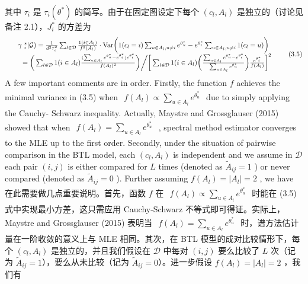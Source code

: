 其中 $\tau_{i}$ 是 $\tau_{i}(\theta^{*})$ 的简写。由于在固定图设定下每个 $(c_{l},A_{l})$ 是独立的（讨论见备注 2.1），$J_{i}^{*}$ 的方差为
\[
\begin{array}{r l} & {\mathrm{~\gamma~}_{i}^{*}|\mathcal{G}) = \frac{1}{d^{2}\tau_{i}^{2}}\sum_{l\in \mathcal{D}}\frac{1(i\in A_{l})}{f^{2}(A_{l})}\cdot \mathrm{Var}\bigg(1(c_{l} = i)\sum_{u\in A_{l},u\neq i}e^{\theta_{u}^{*}} - e^{\theta_{i}^{*}}\sum_{u\in A_{l},u\neq i}1(c_{l} = u)\bigg)}\\ & {\quad = \bigg(\sum_{l\in \mathcal{D}}1(i\in A_{l})\frac{(\sum_{u\in A_{l}}e^{\theta_{u}^{*}} - e^{\theta_{i}^{*}})e^{\theta_{i}^{*}}}{f(A_{l})^{2}}\bigg)\bigg / \bigg[\sum_{l\in \mathcal{D}}1(i\in A_{l})\bigg(\frac{\sum_{u\in A_{l}}e^{\theta_{u}^{*}} - e^{\theta_{i}^{*}}}{\sum_{u\in A_{l}}e^{\theta_{u}^{*}}}\bigg)\frac{e^{\theta_{i}^{*}}}{f(A_{l})}\bigg]^{2}} \end{array} \tag{3.5}
\]
A few important comments are in order. Firstly, the function $f$ achieves the minimal variance in (3.5) when $\begin{array}{r}{f(A_{l})\propto \sum_{u\in A_{l}}e^{\theta_{u}^{*}}} \end{array}$ due to simply applying the Cauchy- Schwarz inequality. Actually, Maystre and Grossglauser (2015) showed that when $\begin{array}{r}f(A_l) = \sum_{u\in A_l}e^{\theta_u^*} \end{array}$ , spectral method estimator converges to the MLE up to the first order. Secondly, under the situation of pairwise comparison in the BTL model, each $(c_l,A_l)$ is independent and we assume in $\mathcal{D}$ each pair $(i,j)$ is either compared for $L$ times (denoted as $\widetilde{A}_{ij} = 1$ ) or never compared (denoted as $\widetilde{A}_{ij} = 0$ ). Further assuming $f(A_{l}) = |A_{l}| = 2$ , we have
在此需要做几点重要说明。首先，函数 $f$ 在 $\begin{array}{r}{f(A_{l})\propto \sum_{u\in A_{l}}e^{\theta_{u}^{*}}} \end{array}$ 时能在 (3.5) 式中实现最小方差，这只需应用 Cauchy-Schwarz 不等式即可得证。实际上，Maystre and Grossglauser (2015) 表明当 $\begin{array}{r}f(A_l) = \sum_{u\in A_l}e^{\theta_u^*} \end{array}$ 时，谱方法估计量在一阶收敛的意义上与 MLE 相同。其次，在 BTL 模型的成对比较情形下，每个 $(c_l,A_l)$ 是独立的，并且我们假设在 $\mathcal{D}$ 中每对 $(i,j)$ 要么比较了 $L$ 次（记为 $\widetilde{A}_{ij} = 1$），要么从未比较（记为 $\widetilde{A}_{ij} = 0$）。进一步假设 $f(A_{l}) = |A_{l}| = 2$ ，我们有
